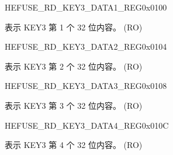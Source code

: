 \begin{register}{H}{EFUSE\_RD\_KEY3\_DATA1\_REG}{0x0100}\label{regdesc:EFUSERDKEY3DATA1REG}
%
\regnewline%
\begin{regdesc}\begin{reglist}
\label{fielddesc:EFUSEKEY3DATA1}\item [EFUSE\_KEY3\_DATA1] 表示 KEY3 第 1 个 32 位内容。 (RO)
\end{reglist}\end{regdesc}
\end{register}


\begin{register}{H}{EFUSE\_RD\_KEY3\_DATA2\_REG}{0x0104}\label{regdesc:EFUSERDKEY3DATA2REG}
%
\regnewline%
\begin{regdesc}\begin{reglist}
\label{fielddesc:EFUSEKEY3DATA2}\item [EFUSE\_KEY3\_DATA2] 表示 KEY3 第 2 个 32 位内容。 (RO)
\end{reglist}\end{regdesc}
\end{register}


\begin{register}{H}{EFUSE\_RD\_KEY3\_DATA3\_REG}{0x0108}\label{regdesc:EFUSERDKEY3DATA3REG}
%
\regnewline%
\begin{regdesc}\begin{reglist}
\label{fielddesc:EFUSEKEY3DATA3}\item [EFUSE\_KEY3\_DATA3] 表示 KEY3 第 3 个 32 位内容。 (RO)
\end{reglist}\end{regdesc}
\end{register}


\begin{register}{H}{EFUSE\_RD\_KEY3\_DATA4\_REG}{0x010C}\label{regdesc:EFUSERDKEY3DATA4REG}
%
\regnewline%
\begin{regdesc}\begin{reglist}
\label{fielddesc:EFUSEKEY3DATA4}\item [EFUSE\_KEY3\_DATA4] 表示 KEY3 第 4 个 32 位内容。 (RO)
\end{reglist}\end{regdesc}
\end{register}


